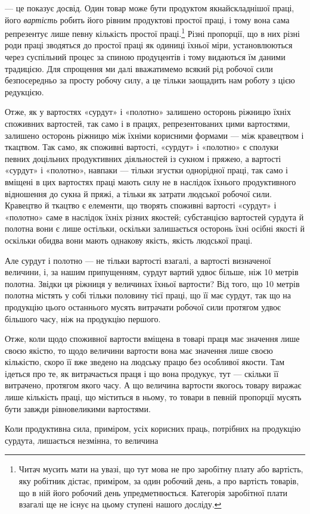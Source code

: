 — це показує досвід. Один товар може бути продуктом якнайскладнішої
праці, його \emph{вартість} робить його рівним продуктові
простої праці, і тому вона сама репрезентує лише певну кількість
простої праці.\footnote{
Читач мусить мати на увазі, що тут мова не про заробітну плату
або вартість, яку робітник дістає, приміром, за один робочий день, а про
вартість товарів, що в ній його робочий день упредметнюється. Категорія
заробітної плати взагалі ще не існує на цьому ступені нашого досліду.
} Різні пропорції, що в них різні роди праці зводяться
до простої праці як одиниці їхньої міри, установлюються
через суспільний процес за спиною продуцентів і тому видаються
їм даними традицією. Для спрощення ми далі вважатимемо всякий
рід робочої сили безпосередньо за просту робочу силу, а це
тільки заощадить нам роботу з цією редукцією.

Отже, як у вартостях «сурдут» і «полотно» залишено осторонь
ріжницю їхніх споживних вартостей, так само і в працях,
репрезентованих цими вартостями, залишено осторонь ріжницю
між їхніми корисними формами — між кравецтвом і ткацтвом.
Так само, як споживні вартості, «сурдут» і «полотно» є сполуки
певних доцільних продуктивних діяльностей із сукном і пряжею,
а вартості «сурдут» і «полотно», навпаки — тільки згустки
однорідної праці, так само і вміщені в цих вартостях праці мають
силу не в наслідок їхнього продуктивного відношення до сукна
й пряжі, а тільки як затрати людської робочої сили. Кравецтво
й ткацтво є елементи, що творять споживні вартості «сурдут»
і «полотно» саме в наслідок їхніх різних якостей; субстанцією
вартостей сурдута й полотна вони є лише остільки, оскільки залишається
осторонь їхні осібні якості й оскільки обидва вони мають
однакову якість, якість людської праці.

Але сурдут і полотно — не тільки вартості взагалі, а вартості
визначеної величини, і, за нашим припущенням, сурдут вартий
удвоє більше, ніж 10 метрів полотна. Звідки ця ріжниця у величинах
їхньої вартости? Від того, що 10 метрів полотна містять у
собі тільки половину тієї праці, що її має сурдут, так що на продукцію
цього останнього мусять витрачати робочої сили протягом
удвоє більшого часу, ніж на продукцію першого.

Отже, коли щодо споживної вартости вміщена в товарі праця
має значення лише своєю якістю, то щодо величини вартости вона
має значення лише своєю кількістю, скоро її вже зведено на людську
працю без особливої якости. Там ідеться про те, як витрачається
праця і що вона продукує, тут — скільки її витрачено,
протягом якого часу. А що величина вартости якогось товару
виражає лише кількість праці, що міститься в ньому, то товари
в певній пропорції мусять бути завжди рівновеликими вартостями.

Коли продуктивна сила, приміром, усіх корисних праць, потрібних
на продукцію сурдута, лишається незмінна, то величина
\parbreak{}  %
